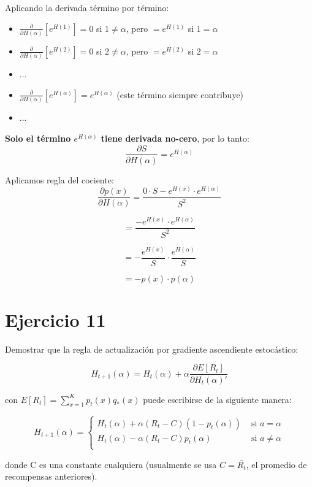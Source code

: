 \documentclass[12pt,a4paper]{article}
\begin{document}
Aplicando la derivada término por término:
\begin{itemize}
    \item $\frac{\partial}{\partial H(\alpha)}[e^{H(1)}] = 0$ si $1 \neq \alpha$, pero $= e^{H(1)}$ si $1 = \alpha$
    \item $\frac{\partial}{\partial H(\alpha)}[e^{H(2)}] = 0$ si $2 \neq \alpha$, pero $= e^{H(2)}$ si $2 = \alpha$
    \item ...
    \item $\frac{\partial}{\partial H(\alpha)}[e^{H(\alpha)}] = e^{H(\alpha)}$ (este término siempre contribuye)
    \item ...
\end{itemize}

\textbf{Solo el término $e^{H(\alpha)}$ tiene derivada no-cero}, por lo tanto:
$$\frac{\partial S}{\partial H(\alpha)} = e^{H(\alpha)}$$

Aplicamos regla del cociente:
$$\frac{\partial p(x)}{\partial H(\alpha)} = \frac{0 \cdot S - e^{H(x)} \cdot e^{H(\alpha)}}{S^2}$$

$$= \frac{-e^{H(x)} \cdot e^{H(\alpha)}}{S^2}$$

$$= -\frac{e^{H(x)}}{S} \cdot \frac{e^{H(\alpha)}}{S}$$

$$= -p(x) \cdot p(\alpha)$$

\section{Ejercicio 11}

Demostrar que la regla de actualización por gradiente ascendiente
estocástico:

$$ H_{t+1}(\alpha) = H_t(\alpha) + \alpha \frac{\partial E[R_t]}{\partial H_t(\alpha)'}$$

con $E[R_t] = \sum_{x=1}^{K} p_t(x)q_*(x)$ puede escribirse de la siguiente manera:

$$ H_{t+1}(\alpha) = 
\begin{cases} 
    H_t(\alpha) + \alpha (R_t - C)(1 - p_t(\alpha)) & \text{ si } a = \alpha \\
    H_t(\alpha) - \alpha (R_t - C)p_t(\alpha) & \text{ si } a \neq \alpha \\
\end{cases} $$

donde C es una constante cualquiera (usualmente se usa $C = \bar{R_t}$,
el promedio de recompensas anteriores).
\end{document}
